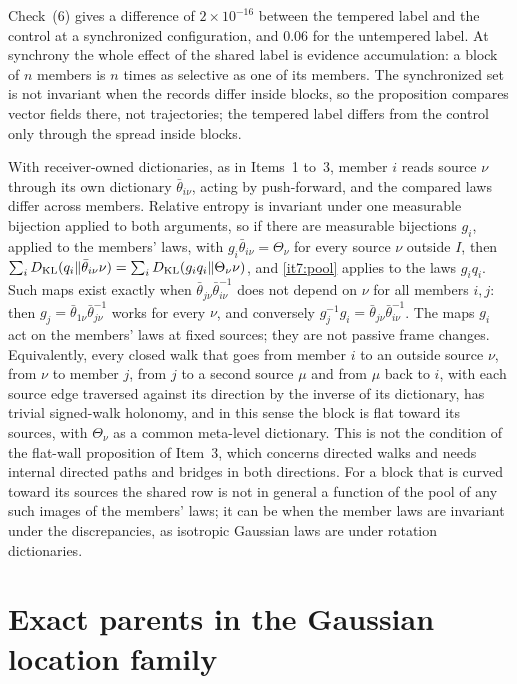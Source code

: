 \documentclass[11pt,letterpaper]{report}
\begin{document}
Check~(6) gives a difference of $2\times10^{-16}$ between the tempered label and the control at a synchronized configuration, and $0.06$ for the untempered label. At synchrony the whole effect of the shared label is evidence accumulation: a block of $n$ members is $n$ times as selective as one of its members. The synchronized set is not invariant when the records differ inside blocks, so the proposition compares vector fields there, not trajectories; the tempered label differs from the control only through the spread inside blocks.

With receiver-owned dictionaries, as in Items~1 to~3, member $i$ reads source $\nu$ through its own dictionary $\bar\theta_{i\nu}$, acting by push-forward, and the compared laws differ across members. Relative entropy is invariant under one measurable bijection applied to both arguments, so if there are measurable bijections $g_i$, applied to the members' laws, with $g_i\bar\theta_{i\nu}=\Theta_\nu$ for every source $\nu$ outside $I$, then $\sum_iD_{\mathrm{KL}}(q_i\Vert\bar\theta_{i\nu}\nu)=\sum_iD_{\mathrm{KL}}(g_iq_i\Vert\Theta_\nu\nu)$, and \cref{it7:pool} applies to the laws $g_iq_i$. Such maps exist exactly when $\bar\theta_{j\nu}\bar\theta_{i\nu}^{-1}$ does not depend on $\nu$ for all members $i,j$: then $g_j=\bar\theta_{1\nu}\bar\theta_{j\nu}^{-1}$ works for every $\nu$, and conversely $g_j^{-1}g_i=\bar\theta_{j\nu}\bar\theta_{i\nu}^{-1}$. The maps $g_i$ act on the members' laws at fixed sources; they are not passive frame changes. Equivalently, every closed walk that goes from member $i$ to an outside source $\nu$, from $\nu$ to member $j$, from $j$ to a second source $\mu$ and from $\mu$ back to $i$, with each source edge traversed against its direction by the inverse of its dictionary, has trivial signed-walk holonomy, and in this sense the block is flat toward its sources, with $\Theta_\nu$ as a common meta-level dictionary. This is not the condition of the flat-wall proposition of Item~3, which concerns directed walks and needs internal directed paths and bridges in both directions. For a block that is curved toward its sources the shared row is not in general a function of the pool of any such images of the members' laws; it can be when the member laws are invariant under the discrepancies, as isotropic Gaussian laws are under rotation dictionaries.

\chapter{Exact parents in the Gaussian location family}
\label{it7:ch-exact}
\end{document}
